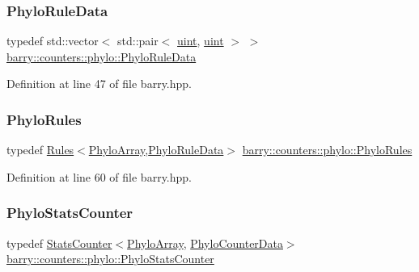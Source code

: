 \subsubsection{\texorpdfstring{Phylo\+Rule\+Data}{PhyloRuleData}}
{\footnotesize\ttfamily typedef std\+::vector$<$ std\+::pair$<$ \hyperlink{namespacebarry_a11dfc53ddb4672278319aa04f1e09a6c}{uint}, \hyperlink{namespacebarry_a11dfc53ddb4672278319aa04f1e09a6c}{uint} $>$ $>$ \hyperlink{namespacebarry_1_1counters_1_1phylo_a5da540950bcf3372bcedb17a5b23667c}{barry\+::counters\+::phylo\+::\+Phylo\+Rule\+Data}}



Definition at line 47 of file barry.\+hpp.

\mbox{\label{namespacebarry_1_1counters_1_1phylo_a7c915b4eab922a92797db96a7e8917c4}} 
\subsubsection{\texorpdfstring{Phylo\+Rules}{PhyloRules}}
{\footnotesize\ttfamily typedef \hyperlink{classbarry_1_1_rules}{Rules}$<$\hyperlink{namespacebarry_1_1counters_1_1phylo_abd293bf65e494e903639fb5fb2c91604}{Phylo\+Array},\hyperlink{namespacebarry_1_1counters_1_1phylo_a5da540950bcf3372bcedb17a5b23667c}{Phylo\+Rule\+Data}$>$ \hyperlink{namespacebarry_1_1counters_1_1phylo_a7c915b4eab922a92797db96a7e8917c4}{barry\+::counters\+::phylo\+::\+Phylo\+Rules}}



Definition at line 60 of file barry.\+hpp.

\mbox{\label{namespacebarry_1_1counters_1_1phylo_abfefb6cff81a19d278b306a79cc011a3}} 
\subsubsection{\texorpdfstring{Phylo\+Stats\+Counter}{PhyloStatsCounter}}
{\footnotesize\ttfamily typedef \hyperlink{classbarry_1_1_stats_counter}{Stats\+Counter}$<$\hyperlink{namespacebarry_1_1counters_1_1phylo_abd293bf65e494e903639fb5fb2c91604}{Phylo\+Array}, \hyperlink{namespacebarry_1_1counters_1_1phylo_a6ecc0d8ab76f8dc2db152221a8e9e95a}{Phylo\+Counter\+Data}$>$ \hyperlink{namespacebarry_1_1counters_1_1phylo_abfefb6cff81a19d278b306a79cc011a3}{barry\+::counters\+::phylo\+::\+Phylo\+Stats\+Counter}}



